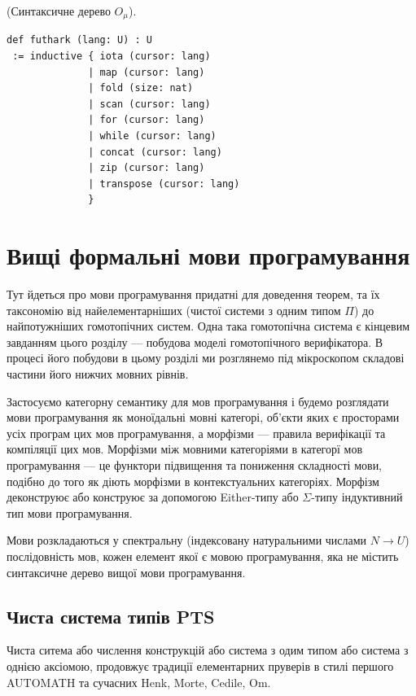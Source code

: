 \begin{definition} (Синтаксичне дерево $O_\mu$).
\begin{lstlisting}
def futhark (lang: U) : U
 := inductive { iota (cursor: lang)
              | map (cursor: lang)
              | fold (size: nat)
              | scan (cursor: lang)
              | for (cursor: lang)
              | while (cursor: lang)
              | concat (cursor: lang)
              | zip (cursor: lang)
              | transpose (cursor: lang)
              }
\end{lstlisting}
\end{definition}

\newpage
\section{Вищі формальні мови програмування}
Тут йдеться про мови програмування придатні для доведення теорем,
та їх таксономію від найелементарніших (чистої системи з одним типом $\Pi$) до
найпотужніших гомотопічних систем. Одна така гомотопічна система є кінцевим завданням
цього розділу --- побудова моделі гомотопічного верифікатора.
В процесі його побудови в цьому розділі ми розглянемо під
мікроскопом складові частини його нижчих мовних рівнів.

Застосуємо категорну семантику для мов програмування і будемо розглядати
мови програмування як моноїдальні мовні категорі, об'єкти яких є просторами
усіх програм цих мов програмування, а морфізми --- правила верифікації та компіляції цих мов.
Морфізми між мовними категоріями в категорї мов програмування --- це
функтори підвищення та пониження складності мови, подібно до того як діють
морфізми в контекстуальних категоріях. Морфізм деконструює або конструює за
допомогою Either-типу або $\Sigma$-типу індуктивний тип мови програмування.

Мови розкладаються у спектральну (індексовану натуральними числами $N \rightarrow U$)
послідовність мов, кожен елемент якої є мовою програмування,
яка не містить синтаксичне дерево вищої мови програмування.

\newpage
\subsection{Чиста система типів PTS}
Чиста ситема або числення конструкцій або система з одим типом або
система з однією аксіомою, продовжує традиції елементарних пруверів
в стилі першого AUTOMATH та сучасних Henk, Morte, Cedile, Om.

